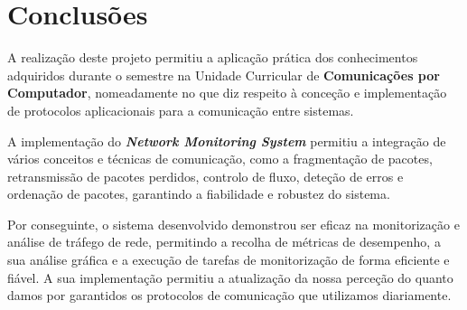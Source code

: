 \documentclass[a4paper,12pt]{scrreprt}
\begin{document}
\clearpage

\section{Conclusões}

A realização deste projeto permitiu a aplicação prática dos conhecimentos adquiridos
durante o semestre na Unidade Curricular de \textbf{Comunicações por Computador},
nomeadamente no que diz respeito à conceção e implementação de protocolos aplicacionais
para a comunicação entre sistemas.

A implementação do \textbf{\textit{Network Monitoring System}} permitiu a integração de
vários conceitos e técnicas de comunicação, como a fragmentação de pacotes, retransmissão
de pacotes perdidos, controlo de fluxo, deteção de erros e ordenação de pacotes, garantindo
a fiabilidade e robustez do sistema.

Por conseguinte, o sistema desenvolvido demonstrou ser eficaz na monitorização e
análise de tráfego de rede, permitindo a recolha de métricas de
desempenho, a sua análise gráfica e a execução de tarefas de monitorização de forma
eficiente e fiável. A sua implementação permitiu a atualização da nossa perceção
do quanto damos por garantidos os protocolos de comunicação que utilizamos diariamente.

\end{document}
